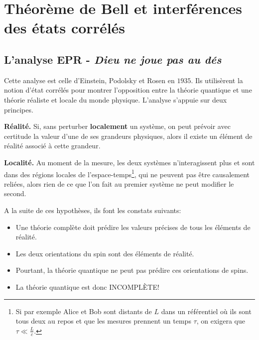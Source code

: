 \section{Théorème de Bell et interférences des états corrélés}
\label{sec:Bell}

\subsection{L'analyse EPR - \emph{Dieu ne joue pas au dés}}

Cette analyse est celle d'Einstein, Podolsky et Rosen en $1935$. Ils utilisèrent
la notion d'état corrélés pour montrer l'opposition entre la théorie quantique
et une théorie réaliste et locale du monde physique. L'analyse s'appuie sur deux
principes.

\begin{principe}
 \textbf{Réalité.} Si, sans perturber \textbf{localement} un système, on peut
prévoir avec certitude la valeur d'une de ses grandeurs physiques, alors il
existe un élément de réalité associé à cette grandeur.
\end{principe}

\begin{principe}
\textbf{Localité.} Au moment de la mesure, les deux systèmes n'interagissent
plus et sont dans des régions locales de l'espace-temps\footnote{Si par exemple
Alice et Bob sont distants de $L$ dans un référentiel où ils sont tous deux au
repos et que les mesures prennent un temps $\tau$, on exigera que
$\tau\ll\frac{L}{c}$.}, qui ne peuvent pas être causalement reliées, alors rien
de ce que l'on fait au premier système ne peut modifier le second.
\end{principe}

A la suite de ces hypothèses, ils font les constats suivants:

\begin{itemize}
\item Une théorie complète doit prédire les valeurs précises de tous les
éléments de réalité.

\item Les deux orientations du spin sont des éléments de réalité.

\item Pourtant, la théorie quantique ne peut pas prédire ces orientations de
spins.

\item La théorie quantique est donc INCOMPLÈTE!
\end{itemize}

